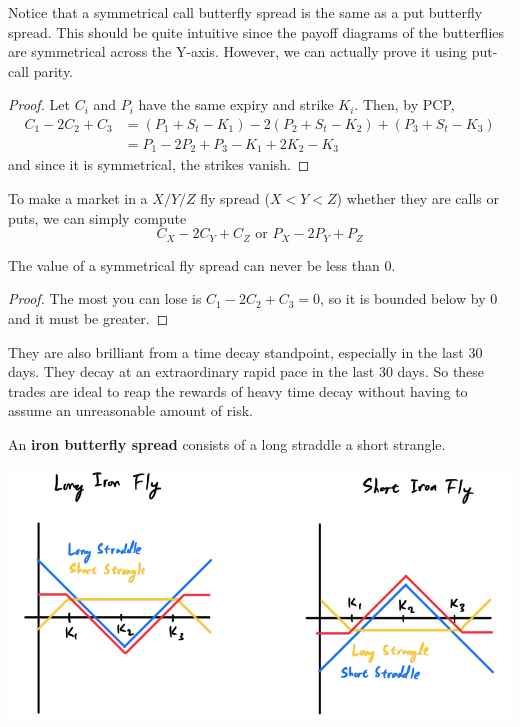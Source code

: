 \documentclass{article}
\begin{document}
    \begin{theorem}
      Notice that a symmetrical call butterfly spread is the same as a put butterfly spread. This should be quite intuitive since the payoff diagrams of the butterflies are symmetrical across the Y-axis. However, we can actually prove it using put-call parity.
    \end{theorem}
    \begin{proof}
      Let $C_i$ and $P_i$ have the same expiry and strike $K_i$. Then, by PCP, 
      \begin{align*}
        C_1 - 2 C_2 + C_3 & = (P_1 + S_t - K_1) - 2 (P_2 + S_t - K_2) + (P_3 + S_t - K_3) \\ 
                          & = P_1 - 2 P_2 + P_3 - K_1 + 2 K_2 - K_3
      \end{align*} 
      and since it is symmetrical, the strikes vanish.
    \end{proof}

    \begin{example}
      To make a market in a $X/Y/Z$ fly spread ($X < Y < Z$) whether they are calls or puts, we can simply compute
      \begin{equation}
        C_X - 2 C_Y + C_Z \text{ or } P_X - 2 P_Y + P_Z
      \end{equation}
    \end{example}

    \begin{theorem}
      The value of a symmetrical fly spread can never be less than $0$. 
    \end{theorem}
    \begin{proof}
      The most you can lose is $C_1 - 2C_2 + C_3 = 0$, so it is bounded below by $0$ and it must be greater. 
    \end{proof}

    They are also brilliant from a time decay standpoint, especially in the last 30 days. They decay at an extraordinary rapid pace in the last 30 days. So these trades are ideal to reap the rewards of heavy time decay without having to assume an unreasonable amount of risk. 

    \begin{definition}
      An \textbf{iron butterfly spread} consists of a long straddle a short strangle. 
      \begin{center}
        \includegraphics[scale=0.35]{img/iron_fly.png}
      \end{center}
    \end{definition}
\end{document}
